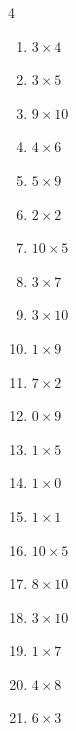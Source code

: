 \begin{multicols}{4}
\begin{enumerate}
  \item $3\times 4$
        \phantom{$=12$}

  \item $3\times 5$
        \phantom{$=15$}

  \item $9\times 10$
        \phantom{$=90$}

  \item $4\times 6$
        \phantom{$=24$}

  \item $5\times 9$
        \phantom{$=45$}

  \item $2\times 2$
        \phantom{$=4$}

  \item $10\times 5$
        \phantom{$=50$}

  \item $3\times 7$
        \phantom{$=21$}

  \item $3\times 10$
        \phantom{$=30$}

  \item $1\times 9$
        \phantom{$=9$}

  \item $7\times 2$
        \phantom{$=14$}

  \item $0\times 9$
        \phantom{$=0$}

\columnbreak %

  \item $1\times 5$
        \phantom{$=5$}

  \item $1\times 0$
        \phantom{$=0$}

  \item $1\times 1$
        \phantom{$=1$}

  \item $10\times 5$
        \phantom{$=50$}

  \item $8\times 10$
        \phantom{$=80$}

  \item $3\times 10$
        \phantom{$=30$}

  \item $1\times 7$
        \phantom{$=7$}

  \item $4\times 8$
        \phantom{$=32$}

  \item $6\times 3$
        \phantom{$=18$}


\end{enumerate}
\end{multicols}
